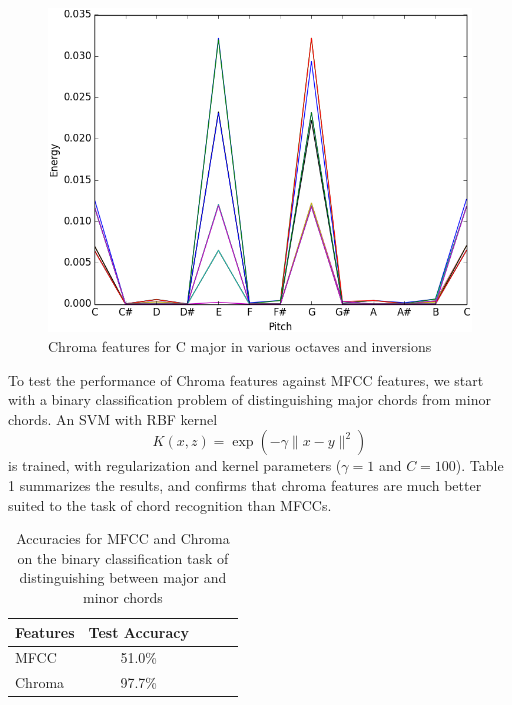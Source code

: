 \documentclass{article}
\begin{document}
\begin{figure}[ht]
\vskip 0.2in
\begin{center}
\centerline{\includegraphics[width=\columnwidth]{chromac}}
\caption{Chroma features for C major in various octaves and inversions}
\label{chroma}
\end{center}
\vskip -0.2in
\end{figure}

To test the performance of Chroma features against MFCC features, we start with
a binary classification problem of distinguishing major chords from minor
chords. An SVM with RBF kernel $$ K(x, z) = \exp(-\gamma\lVert{x - y}\rVert^2)$$
is trained, with regularization and kernel parameters ($\gamma = 1$ and $C =
100$). Table 1 summarizes the results, and confirms that chroma features are
much better suited to the task of chord recognition than MFCCs.

\begin{table}[t]
\caption{Accuracies for MFCC and Chroma on the binary classification task of
distinguishing between major and minor chords}
\label{mfccvschroma}
\vskip 0.15in
\begin{center}
\begin{small}
\begin{sc}
\begin{tabular}{lcccr}
\hline
\abovespace\belowspace
Features & Test Accuracy \\
\hline
\abovespace
MFCC & 51.0\%\\
Chroma & 97.7\%\\
\hline
\end{tabular}
\end{sc}
\end{small}
\end{center}
\vskip -0.1in
\end{table}
\end{document}
